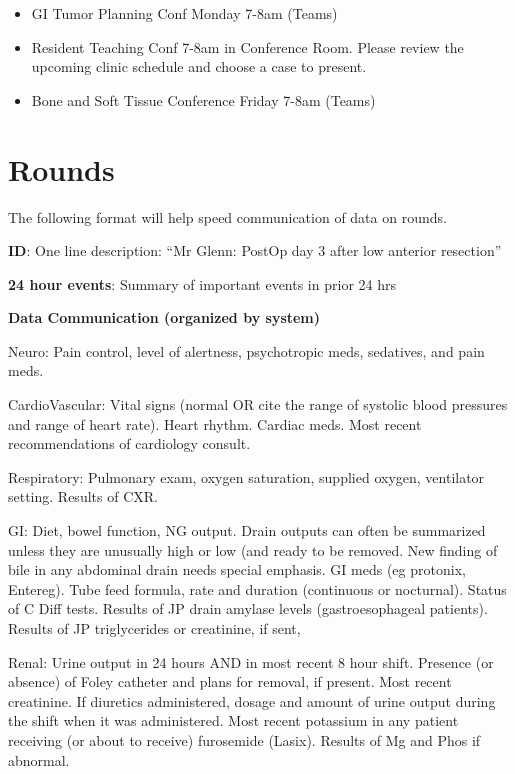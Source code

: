 \documentclass[
  letterpaper,
]{scrbook}
\providecommand{\tightlist}{%
  \setlength{\itemsep}{0pt}\setlength{\parskip}{0pt}}
\begin{document}
\begin{itemize}
\tightlist
\item
  GI Tumor Planning Conf Monday 7-8am (Teams)
\item
  Resident Teaching Conf 7-8am in Conference Room. Please review the
  upcoming clinic schedule and choose a case to present.
\item
  Bone and Soft Tissue Conference Friday 7-8am (Teams)
\end{itemize}

\chapter{Rounds}\label{rounds-2}

The following format will help speed communication of data on rounds.

\textbf{ID}: One line description: ``Mr Glenn: PostOp day 3 after low
anterior resection''

\textbf{24 hour events}: Summary of important events in prior 24 hrs

\textbf{Data Communication (organized by system)}

Neuro: Pain control, level of alertness, psychotropic meds, sedatives,
and pain meds.

CardioVascular: Vital signs (normal OR cite the range of systolic blood
pressures and range of heart rate). Heart rhythm. Cardiac meds. Most
recent recommendations of cardiology consult.

Respiratory: Pulmonary exam, oxygen saturation, supplied oxygen,
ventilator setting. Results of CXR.

GI: Diet, bowel function, NG output. Drain outputs can often be
summarized unless they are unusually high or low (and ready to be
removed. New finding of bile in any abdominal drain needs special
emphasis. GI meds (eg protonix, Entereg). Tube feed formula, rate and
duration (continuous or nocturnal). Status of C Diff tests. Results of
JP drain amylase levels (gastroesophageal patients). Results of JP
triglycerides or creatinine, if sent,

Renal: Urine output in 24 hours AND in most recent 8 hour shift.
Presence (or absence) of Foley catheter and plans for removal, if
present. Most recent creatinine. If diuretics administered, dosage and
amount of urine output during the shift when it was administered. Most
recent potassium in any patient receiving (or about to receive)
furosemide (Lasix). Results of Mg and Phos if abnormal.
\end{document}
